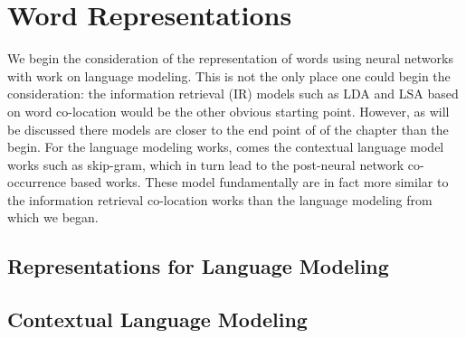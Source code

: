 \documentclass[12pt,parskip]{komatufte}
\begin{document}
\chapter{Word Representations}\label{sec:word-representations}


We begin the consideration of the representation of words using neural networks with work on language modeling.
This is not the only place one could begin the consideration: the information retrieval (IR) models such as LDA and LSA based on word co-location would be the other obvious starting point.
However, as will be discussed there models are closer to the end point of of the chapter than the begin.
For the language modeling works, comes the contextual language model works such as skip-gram, which in turn lead to the post-neural network co-occurrence based works.
These model fundamentally are in fact more similar to the information retrieval co-location works than the language modeling from which we began.


\section{Representations for Language Modeling}
\textcite{NPLM} 

\textcite{collobert2008unified}

\textcite{mikolov2011RnnLM,mikolov2010recurrent,6163930}

\section{Contextual Language Modeling}

\textcite{mikolov2012contextRNNLM,mikolov2013linguisticsubstructures,mikolovSkip}




\end{document}
